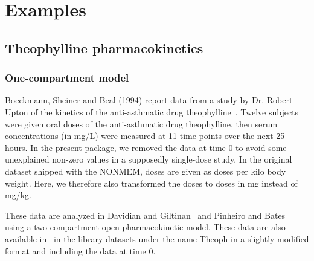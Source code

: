 




\chapter{Examples} \label{chapter_example}

\section{Theophylline pharmacokinetics} \label{sec:exampletheo}

\subsection{One-compartment model}

Boeckmann, Sheiner and Beal (1994) report data from a study by Dr. Robert Upton of the kinetics of the anti-asthmatic drug theophylline~\cite{NONMEM}. Twelve subjects were given oral doses of the anti-asthmatic drug theophylline, then serum concentrations (in mg/L) were measured at 11 time points over the next 25 hours. In the present package, we removed the data at time 0 to avoid some unexplained non-zero values in a supposedly single-dose study. In the original dataset shipped with the {\sf NONMEM}, doses are given as doses per kilo body weight. Here, we therefore also transformed the doses to doses in mg instead of mg/kg.

These data are analyzed in Davidian and Giltinan~\cite{Davidian95} and Pinheiro and Bates~\cite{Pinheiro95} using a two-compartment open pharmacokinetic model. These data are also available in \R~in the library {\sf datasets} under the name {\sf Theoph} in a slightly modified format and including the data at time 0.

